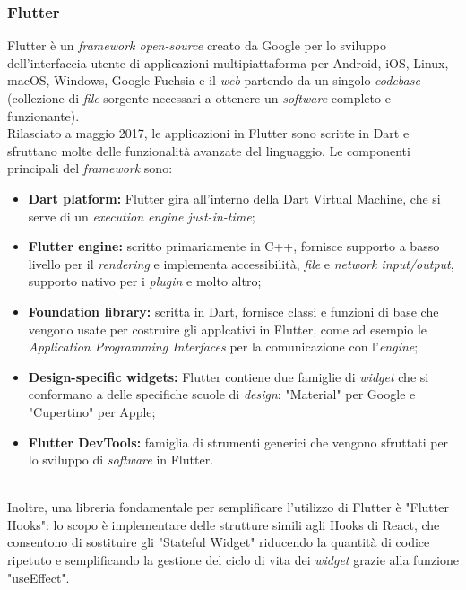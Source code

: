 \subsubsection{Flutter}
Flutter è un \textit{framework open-source} creato da Google per lo sviluppo dell'interfaccia utente di applicazioni multipiattaforma per Android, iOS, Linux, macOS, Windows, Google Fuchsia e il \textit{web} partendo da un singolo \textit{codebase} (collezione di \textit{file} sorgente necessari a ottenere un \textit{software} completo e funzionante).\\
Rilasciato a maggio 2017, le applicazioni in Flutter sono scritte in Dart e sfruttano molte delle funzionalità avanzate del linguaggio. Le componenti principali del \textit{framework} sono:
\begin{itemize}
    \item \textbf{Dart platform:} Flutter gira all'interno della Dart Virtual Machine, che si serve di un \textit{execution engine just-in-time};
    \item \textbf{Flutter engine:} scritto primariamente in C++, fornisce supporto a basso livello per il \textit{rendering} e implementa accessibilità, \textit{file} e \textit{network input/output}, supporto nativo per i \textit{plugin} e molto altro;
    \item \textbf{Foundation library:} scritta in Dart, fornisce classi e funzioni di base che vengono usate per costruire gli applcativi in Flutter, come ad esempio le \textit{Application Programming Interfaces} per la comunicazione con l'\textit{engine};
    \item \textbf{Design-specific widgets:} Flutter contiene due famiglie di \textit{widget} che si conformano a delle specifiche scuole di \textit{design}: "Material" per Google e "Cupertino" per Apple;
    \item \textbf{Flutter DevTools:} famiglia di strumenti generici che vengono sfruttati per lo sviluppo di \textit{software} in Flutter.
\end{itemize}
~\\
Inoltre, una libreria fondamentale per semplificare l'utilizzo di Flutter è "Flutter Hooks": lo scopo è implementare delle strutture simili agli Hooks di React, che consentono di sostituire gli "Stateful Widget" riducendo la quantità di codice ripetuto e semplificando la gestione del ciclo di vita dei \textit{widget} grazie alla funzione "useEffect".

